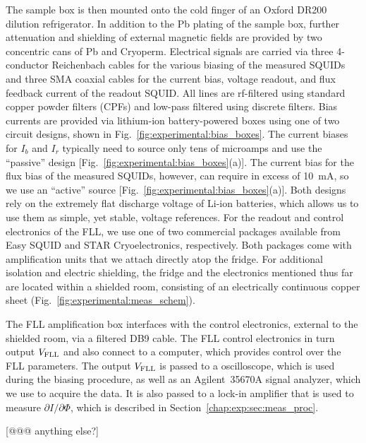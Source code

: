 The sample box is then mounted onto the cold finger of an Oxford DR200 dilution refrigerator. In addition to the Pb plating of the sample box, further attenuation and shielding of external magnetic fields are provided by two concentric cans of Pb and Cryoperm. Electrical signals are carried via three 4-conductor Reichenbach cables for the various biasing of the measured SQUIDs and three SMA coaxial cables for the current bias, voltage readout, and flux feedback current of the readout SQUID. All lines are rf-filtered using standard copper powder filters (CPFs) and low-pass filtered using discrete filters. Bias currents are provided via lithium-ion battery-powered boxes using one of two circuit designs, shown in Fig.~\ref{fig:experimental:bias_boxes}. The current biases for $I_b$ and $I_r$ typically need to source only tens of microamps and use the ``passive'' design  [Fig.~\ref{fig:experimental:bias_boxes}(a)]. The current bias for the flux bias of the measured SQUIDs, however, can require in excess of 10~mA, so we use an ``active'' source [Fig.~\ref{fig:experimental:bias_boxes}(a)]. Both designs rely on the extremely flat discharge voltage of Li-ion batteries, which allows us to use them as simple, yet stable, voltage references. For the readout and control electronics of the FLL, we use one of two commercial packages available from Easy SQUID and STAR Cryoelectronics, respectively. Both packages come with amplification units that we attach directly atop the fridge. For additional isolation and electric shielding, the fridge and the electronics mentioned thus far are located within a shielded room, consisting of an electrically continuous copper sheet (Fig.~\ref{fig:experimental:meas_schem}).

The FLL amplification box interfaces with the control electronics, external to the shielded room, via a filtered DB9 cable. The FLL control electronics in turn output $V_\text{FLL}$ and also connect to a computer, which provides control over the FLL parameters. The output $V_\text{FLL}$ is passed to a oscilloscope, which is used during the biasing procedure, as well as an Agilent~35670A signal analyzer, which we use to acquire the data. It is also passed to a lock-in amplifier that is used to measure $\partial I/\partial \Phi$, which is described in Section~\ref{chap:exp:sec:meas_proc}.

[@@@ anything else?]

